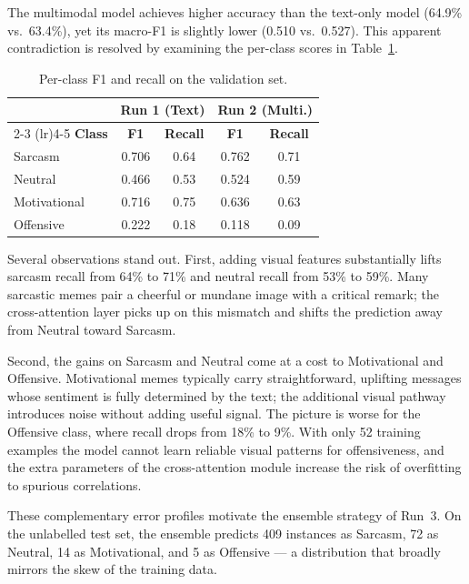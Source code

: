 \documentclass[
]{ceurart}
\begin{document}
The multimodal model achieves higher accuracy than the text-only model (64.9\% vs.\ 63.4\%), yet its macro-F1 is slightly lower (0.510 vs.\ 0.527). This apparent contradiction is resolved by examining the per-class scores in Table~\ref{tab:perclass}.

\begin{table}[h]
\caption{Per-class F1 and recall on the validation set.}
\label{tab:perclass}
\begin{tabular}{l cc cc}
\toprule
 & \multicolumn{2}{c}{\textbf{Run 1 (Text)}} & \multicolumn{2}{c}{\textbf{Run 2 (Multi.)}} \\
\cmidrule(lr){2-3} \cmidrule(lr){4-5}
\textbf{Class} & \textbf{F1} & \textbf{Recall} & \textbf{F1} & \textbf{Recall} \\
\midrule
Sarcasm      & 0.706 & 0.64 & 0.762 & 0.71 \\
Neutral      & 0.466 & 0.53 & 0.524 & 0.59 \\
Motivational & 0.716 & 0.75 & 0.636 & 0.63 \\
Offensive    & 0.222 & 0.18 & 0.118 & 0.09 \\
\bottomrule
\end{tabular}
\end{table}

Several observations stand out. First, adding visual features substantially lifts sarcasm recall from 64\% to 71\% and neutral recall from 53\% to 59\%. Many sarcastic memes pair a cheerful or mundane image with a critical remark; the cross-attention layer picks up on this mismatch and shifts the prediction away from Neutral toward Sarcasm.

Second, the gains on Sarcasm and Neutral come at a cost to Motivational and Offensive. Motivational memes typically carry straightforward, uplifting messages whose sentiment is fully determined by the text; the additional visual pathway introduces noise without adding useful signal. The picture is worse for the Offensive class, where recall drops from 18\% to 9\%. With only 52 training examples the model cannot learn reliable visual patterns for offensiveness, and the extra parameters of the cross-attention module increase the risk of overfitting to spurious correlations.

These complementary error profiles motivate the ensemble strategy of Run~3. On the unlabelled test set, the ensemble predicts 409 instances as Sarcasm, 72 as Neutral, 14 as Motivational, and 5 as Offensive --- a distribution that broadly mirrors the skew of the training data.
\end{document}

